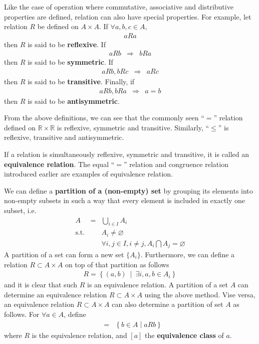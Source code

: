 Like the case of operation where commutative, associative and distributive properties are defined, relation can also have special properties. For example, let relation $R$ be defined on $A \times A$. If $\forall a,b,c \in A$,
\begin{eqnarray}
	aRa \nonumber
\end{eqnarray}
then $R$ is said to be \textbf{reflexive}. If
\begin{eqnarray}
	aRb &\Rightarrow& bRa \nonumber
\end{eqnarray}
then $R$ is said to be \textbf{symmetric}. If
\begin{eqnarray}
	aRb, bRc &\Rightarrow& aRc \nonumber 
\end{eqnarray}
then $R$ is said to be \textbf{transitive}. Finally, if
\begin{eqnarray}
	aRb, bRa &\Rightarrow& a=b \nonumber 
\end{eqnarray}
then $R$ is said to be \textbf{antisymmetric}.

From the above definitions, we can see that the commonly seen ``$=$'' relation defined on $\mathbb{R}\times\mathbb{R}$ is reflexive, symmetric and transitive. Similarly, ``$\leq$'' is reflexive, transitive and antisymmetric.

If a relation is simultaneously reflexive, symmetric and transitive, it is called an \textbf{equivalence relation}. The equal ``$=$'' relation and congruence relation introduced earlier are examples of equivalence relation.

We can define a \textbf{partition of a (non-empty) set} by grouping its elements into non-empty subsets in such a way that every element is included in exactly one subset, i.e.
\begin{eqnarray}
	A &=& \bigcup_{i\in I}A_i \nonumber \\
	\mathrm{s.t.} && A_i \neq \varnothing \nonumber \\
	&& \forall i, j \in I, i\neq j, A_i \bigcap A_j = \varnothing \nonumber
\end{eqnarray}
A partition of a set can form a new set $\{A_i\}$. Furthermore, we can define a relation $R\subset A \times A$ on top of that partition as follows
\begin{eqnarray}
	R = \left\{(a,b)~\middle|~\exists i, a,b \in A_i\right\} \nonumber
\end{eqnarray}
and it is clear that such $R$ is an equivalence relation. A partition of a set $A$ can determine an equivalence relation $R\subset A\times A$ using the above method. Vise versa, an equivalence relation $R\subset A\times A$ can also determine a partition of set $A$ as follows. For $\forall a \in A$, define
\begin{eqnarray}
	[a] &=& \left\{b \in A\middle| aRb \right\} \nonumber
\end{eqnarray}
where $R$ is the equivalence relation, and $[a]$ the \textbf{equivalence class} of $a$. 

